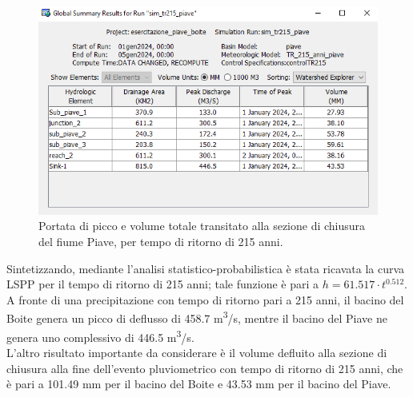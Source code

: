 \begin{figure}[H] \centering
\includegraphics[scale=0.6]{immagini/risul_piave_215.PNG}
\caption{Portata di picco e volume totale transitato alla sezione di chiusura del fiume Piave, per tempo di ritorno di 215 anni.}
\label{figure:risul_piave_215}
\end{figure}

Sintetizzando, mediante l'analisi statistico-probabilistica è stata ricavata la curva LSPP per il tempo di ritorno di 215 anni; tale funzione è pari a $h=61.517 \cdot t ^{0.512}$.\\
A fronte di una precipitazione con tempo di ritorno pari a 215 anni, il bacino del Boite genera un picco di deflusso di 458.7 \unit{m^3/s}, mentre il bacino del Piave ne genera uno complessivo di 446.5 \unit{m^3/s}.\\
L'altro risultato importante da considerare è il volume defluito alla sezione di chiusura alla fine dell'evento pluviometrico con tempo di ritorno di 215 anni, che è pari a 101.49 mm per il bacino del Boite e 43.53 mm per il bacino del Piave.